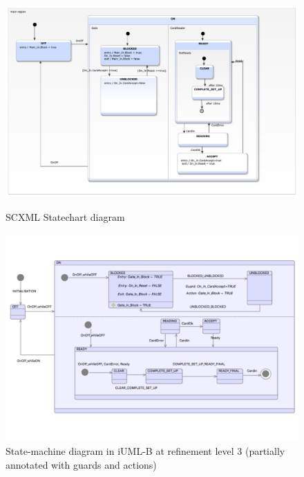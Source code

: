 \documentclass{easychair}
\begin{document}
\begin{figure}
\begin{minipage}[]{.5\textwidth}
  \includegraphics[width=1\textwidth]{caseStudy/TurnstileSimpleModel}
  \caption{SCXML Statechart diagram}
  \label{fig:StatemachineSCXML}
\end{minipage}
\begin{minipage}[]{.5\textwidth}
  \includegraphics[width=1\textwidth]{caseStudy/TurnstileSimpleModel_iumlb}
  \caption{State-machine diagram in iUML-B at refinement level 3 (partially annotated with guards and actions)}
  \label{fig:StatemachineiUML-B}
\end{minipage}
\end{figure}

\end{document}
